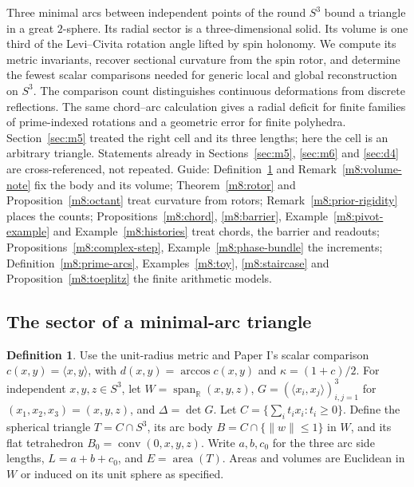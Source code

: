 \documentclass[11pt,reqno]{amsart}
\theoremstyle{definition}
\newtheorem{definition}[theorem]{Definition}
\theoremstyle{remark}
\numberwithin{equation}{section}
\begin{document}
Three minimal arcs between independent points of the round $S^3$ bound a
triangle in a great $2$-sphere. Its radial sector is a three-dimensional
solid. Its volume is one third of the Levi--Civita rotation angle
lifted by spin holonomy. We compute its metric invariants, recover sectional curvature
from the spin rotor, and determine the fewest scalar comparisons needed
for generic local and global reconstruction on $S^3$. The comparison
count distinguishes continuous deformations from discrete reflections.
The same chord--arc calculation gives a radial deficit for finite families
of prime-indexed rotations and a geometric error for finite polyhedra.  Section~\ref{sec:m5} treated the right cell and its
three lengths; here the cell is an arbitrary triangle.  Statements already in Sections~\ref{sec:m5}, \ref{sec:m6} and \ref{sec:d4} are
cross-referenced, not repeated.  Guide: Definition~\ref{m8:body} and Remark~\ref{m8:volume-note} fix the body and its volume;
Theorem~\ref{m8:rotor} and Proposition~\ref{m8:octant} treat curvature from rotors; Remark~\ref{m8:prior-rigidity} places the counts;
Propositions~\ref{m8:chord}, \ref{m8:barrier}, Example~\ref{m8:pivot-example} and Example~\ref{m8:histories} treat chords, the barrier
and readouts; Propositions~\ref{m8:complex-step}, Example~\ref{m8:phase-bundle} the increments; Definition~\ref{m8:prime-arcs},
Examples~\ref{m8:toy}, \ref{m8:staircase} and Proposition~\ref{m8:toeplitz} the finite arithmetic models.

\subsection{The sector of a minimal-arc triangle}

\begin{definition}\label{m8:body}
Use the unit-radius metric and Paper I's scalar comparison
$c(x,y)=\langle x,y\rangle$, with
$d(x,y)=\arccos c(x,y)$ and $\kappa=(1+c)/2$. For independent
$x,y,z\in S^3$, let $W=\operatorname{span}_{\mathbb R}(x,y,z)$,
$G=(\langle x_i,x_j\rangle)_{i,j=1}^3$ for $(x_1,x_2,x_3)=(x,y,z)$,
and $\Delta=\det G$. Let $C=\{\sum_i t_i x_i:t_i\ge0\}$. Define the
spherical triangle $T=C\cap S^3$, its arc body $B=C\cap\{\|w\|\le1\}$
in $W$, and its flat tetrahedron $B_0=\operatorname{conv}(0,x,y,z)$.
Write $a,b,c_0$ for the three arc side lengths, $L=a+b+c_0$,
and $E=\operatorname{area}(T)$. Areas and volumes are Euclidean in $W$
or induced on its unit sphere as specified.
\end{definition}
\end{document}
